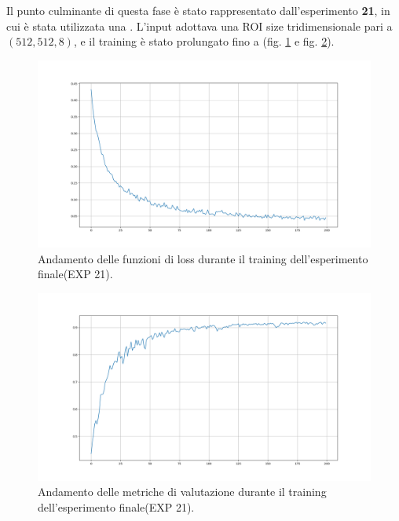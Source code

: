 Il punto culminante di questa fase è stato rappresentato dall’esperimento \textbf{21}, in cui è stata utilizzata una . L’input adottava una ROI size tridimensionale pari a $(512, 512, 8)$, e il training è stato prolungato fino a  (fig. \ref{fig:losses} e fig. \ref{fig:metrics}). 

\begin{minipage}{.48\textwidth}
    \begin{figure}[H] 
        \centering 
        \includegraphics[width=\textwidth]{figures/losses.png} 
        \caption{Andamento delle funzioni di loss durante il training dell’esperimento finale(EXP 21).}
        \label{fig:losses}
    \end{figure} 
\end{minipage}
\hfill
\begin{minipage}{.48\textwidth}
    \begin{figure}[H] 
        \centering 
        \includegraphics[width=\textwidth]{figures/metrics.png} 
        \caption{Andamento delle metriche di valutazione durante il training dell’esperimento finale(EXP 21).}
        \label{fig:metrics}
    \end{figure} 
\end{minipage}



